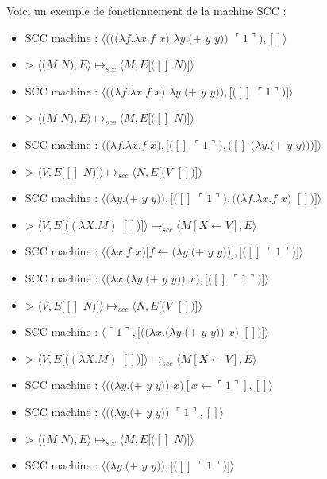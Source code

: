 \documentclass[10pt,a4paper]{article}
\begin{document}
				Voici un exemple de fonctionnement de la machine SCC :
					
				\begin{itemize}
					\item[] SCC machine : $\langle(((\lambda f.\lambda x.f$ $x)$ $\lambda y.(+$ $y$ $y))$ $\ulcorner 1\urcorner),[]\rangle$
					\item[] > $\langle(M$ $N),E\rangle \longmapsto_{scc} \langle M,E[([]$ $N)]\rangle$
					\item[] SCC machine : $\langle((\lambda f.\lambda x.f$ $x)$ $\lambda y.(+$ $y$ $y)),[([]$ $\ulcorner 1\urcorner)]\rangle$
					\item[] > $\langle(M$ $N),E\rangle \longmapsto_{scc} \langle M,E[([]$ $N)]\rangle$
					\item[] SCC machine : $\langle(\lambda f.\lambda x.f$ $x),[([]$ $\ulcorner 1\urcorner),([]$ $(\lambda y.(+$ $y$ $y)))]\rangle$
					\item[] >  $\langle V,E[[]$ $N)]\rangle \longmapsto_{scc} \langle N,E[(V$ $[])]\rangle$
					\item[] SCC machine : $\langle(\lambda y.(+$ $y$ $y)),[([]$ $\ulcorner 1\urcorner),((\lambda f.\lambda x.f$ $x)$ $[])]\rangle$
					\item[] > $\langle V,E[((\lambda X.M)$ $[])]\rangle \longmapsto_{scc} \langle M[X\leftarrow V],E\rangle$
					\item[] SCC machine : $\langle(\lambda x.f$ $x)[f\leftarrow(\lambda y.(+$ $y$ $y))],[([]$ $\ulcorner 1\urcorner)]\rangle$
					\item[] SCC machine : $\langle(\lambda x.(\lambda y.(+$ $y$ $y))$ $x),[([]$ $\ulcorner 1\urcorner)]\rangle$
					\item[] >  $\langle V,E[[]$ $N)]\rangle \longmapsto_{scc} \langle N,E[(V$ $[])]\rangle$
					\item[] SCC machine : $\langle\ulcorner 1\urcorner,[((\lambda x.(\lambda y.(+$ $y$ $y))$ $x)$ $[])]\rangle$
					\item[] > $\langle V,E[((\lambda X.M)$ $[])]\rangle \longmapsto_{scc} \langle M[X\leftarrow V],E\rangle$
					\item[] SCC machine : $\langle((\lambda y.(+$ $y$ $y))$ $x)[x \leftarrow\ulcorner 1\urcorner],[]\rangle$
					\item[] SCC machine : $\langle((\lambda y.(+$ $y$ $y))$ $\ulcorner 1\urcorner,[]\rangle$
					\item[] > $\langle(M$ $N),E\rangle \longmapsto_{scc} \langle M,E[([]$ $N)]\rangle$
					\item[] SCC machine : $\langle(\lambda y.(+$ $y$ $y)),[([]$ $\ulcorner 1\urcorner)]\rangle$

\end{itemize}
\end{document}
